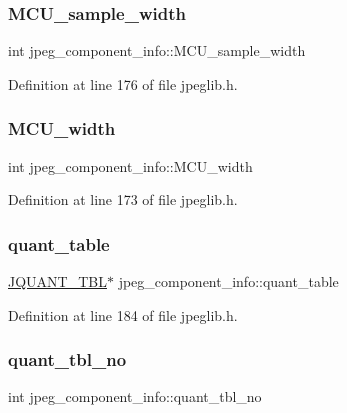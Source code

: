 \subsubsection{\texorpdfstring{MCU\_sample\_width}{MCU\_sample\_width}}
{\footnotesize\ttfamily int jpeg\+\_\+component\+\_\+info\+::\+M\+C\+U\+\_\+sample\+\_\+width}



Definition at line 176 of file jpeglib.\+h.

\mbox{\label{structjpeg__component__info_a82a5bababd81410839aefec8a61878de}} 
\subsubsection{\texorpdfstring{MCU\_width}{MCU\_width}}
{\footnotesize\ttfamily int jpeg\+\_\+component\+\_\+info\+::\+M\+C\+U\+\_\+width}



Definition at line 173 of file jpeglib.\+h.

\mbox{\label{structjpeg__component__info_afd551e8e9dbc3f3076c10cd4d391fdac}} 
\subsubsection{\texorpdfstring{quant\_table}{quant\_table}}
{\footnotesize\ttfamily \mbox{\hyperlink{structJQUANT__TBL}{J\+Q\+U\+A\+N\+T\+\_\+\+T\+BL}}$\ast$ jpeg\+\_\+component\+\_\+info\+::quant\+\_\+table}



Definition at line 184 of file jpeglib.\+h.

\mbox{\label{structjpeg__component__info_a0a9d70b6a95d3ca58a34a7ea8bfefbf8}} 
\subsubsection{\texorpdfstring{quant\_tbl\_no}{quant\_tbl\_no}}
{\footnotesize\ttfamily int jpeg\+\_\+component\+\_\+info\+::quant\+\_\+tbl\+\_\+no}



